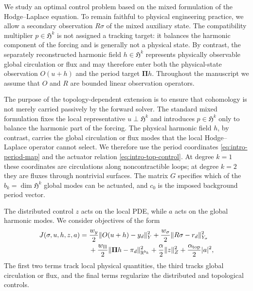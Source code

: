 \documentclass{article}
\newcommand{\R} {\mathbb R}
\newcommand{\HH}{\mathfrak H}
\newcommand{\Piop}{\boldsymbol\Pi}
\newcommand{\norm}[1]{\lVert #1\rVert}
\begin{document}

We study an optimal control problem based on the mixed formulation of the Hodge--Laplace equation. To remain faithful to physical engineering practice, we allow a secondary observation $R\sigma$ of the mixed auxiliary state. The compatibility multiplier $p\in\HH^k$ is not assigned a tracking target: it balances the harmonic component of the forcing and is generally not a physical state. By contrast, the separately reconstructed harmonic field $h\in\HH^k$ represents physically observable global circulation or flux and may therefore enter both the physical-state observation $O(u+h)$ and the period target $\Piop h$. Throughout the manuscript we assume that $O$ and $R$ are bounded linear observation operators. 

The purpose of the topology-dependent extension is to ensure that cohomology is not merely carried passively by the forward solver.  The standard mixed formulation fixes the local representative $u\perp\HH^k$ and introduces $p\in\HH^k$ only to balance the harmonic part of the forcing.  The physical harmonic field $h$, by contrast, carries the global circulation or flux modes that the local Hodge--Laplace operator cannot select.  We therefore use the period coordinates \eqref{eq:intro-period-map} and the actuator relation \eqref{eq:intro-top-control}.  At degree $k=1$ these coordinates are circulations along noncontractible loops; at degree $k=2$ they are fluxes through nontrivial surfaces.  The matrix $G$ specifies which of the $b_k=\dim\HH^k$ global modes can be actuated, and $c_0$ is the imposed background period vector.

The distributed control $z$ acts on the local PDE, while $a$ acts on the global harmonic modes. We consider objectives of the form
\begin{equation}\label{eq:intro-objective}
\begin{aligned}
J(\sigma,u,h,z,a)
={}&\frac{w_y}{2}\norm{O(u+h)-y_d}_{Y}^{2}
 +\frac{w_\sigma}{2}\norm{R\sigma-r_d}_{Y_\sigma}^{2} \\
&+\frac{w_\Pi}{2}\norm{\Piop h-\pi_d}_{\R^{b_k}}^{2}
 +\frac{\alpha}{2}\norm{z}_{Z}^{2}
 +\frac{\alpha_{\rm top}}{2}\lvert a\rvert^{2},
\end{aligned}
\end{equation}
The first two terms track local physical quantities, the third tracks global circulation or flux, and the final terms regularize the distributed and topological controls.
\end{document}
